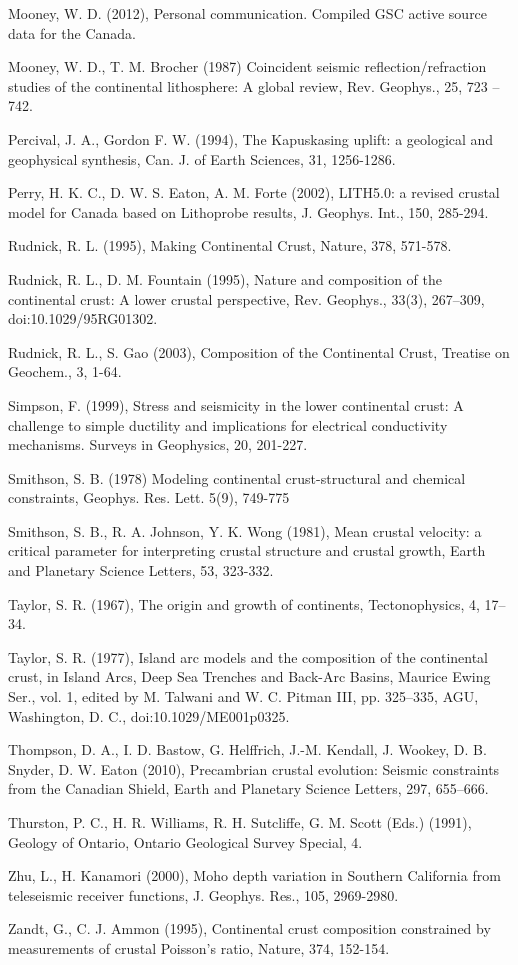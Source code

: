\documentclass[review]{elsarticle}
\begin{document}
Mooney, W. D. (2012), Personal communication. Compiled GSC active source data for the Canada.

Mooney, W. D., T. M. Brocher (1987) Coincident seismic reflection/refraction studies of the continental lithosphere: A global review, Rev. Geophys., 25, 723 – 742.

Percival, J. A., Gordon F. W. (1994), The Kapuskasing uplift: a geological and geophysical synthesis, Can. J. of Earth Sciences, 31, 1256-1286.

Perry, H. K. C., D. W. S. Eaton, A. M. Forte (2002), LITH5.0: a revised crustal model for Canada based on Lithoprobe results,  J. Geophys. Int., 150, 285-294.

Rudnick, R. L. (1995), Making Continental Crust, Nature, 378, 571-578.

Rudnick, R. L., D. M. Fountain (1995), Nature and composition of the continental crust: A lower crustal perspective, Rev. Geophys., 33(3), 267–309, doi:10.1029/95RG01302.

Rudnick, R. L., S. Gao (2003), Composition of the Continental Crust, Treatise on Geochem., 3, 1-64.

Simpson, F. (1999), Stress and seismicity in the lower continental crust: A challenge to simple ductility and implications for electrical conductivity mechanisms. Surveys in Geophysics, 20, 201-227.

Smithson, S. B. (1978) Modeling continental crust-structural and chemical constraints, Geophys. Res. Lett. 5(9), 749-775

Smithson, S. B., R. A. Johnson, Y. K. Wong (1981), Mean crustal velocity: a critical parameter for interpreting crustal structure and crustal growth, Earth and Planetary Science Letters, 53, 323-332.

Taylor, S. R. (1967), The origin and growth of continents, Tectonophysics, 4, 17–34.

Taylor, S. R. (1977), Island arc models and the composition of the continental crust, in Island Arcs, Deep Sea Trenches and Back-Arc Basins, Maurice Ewing Ser., vol. 1, edited by M. Talwani and W. C. Pitman III, pp. 325–335, AGU, Washington, D. C., doi:10.1029/ME001p0325.

Thompson, D. A., I. D. Bastow, G. Helffrich, J.-M. Kendall, J. Wookey, D. B. Snyder, D. W. Eaton (2010), Precambrian crustal evolution: Seismic constraints from the Canadian Shield, Earth and Planetary Science Letters, 297, 655–666.

Thurston, P. C., H. R. Williams, R. H. Sutcliffe, G. M. Scott (Eds.) (1991), Geology of Ontario, Ontario Geological Survey Special, 4.

Zhu, L., H. Kanamori (2000), Moho depth variation in Southern California from teleseismic receiver functions, J. Geophys. Res., 105, 2969-2980.

Zandt, G., C. J. Ammon (1995), Continental crust composition constrained by measurements of crustal Poisson's ratio, Nature, 374, 152-154.
\end{document}
